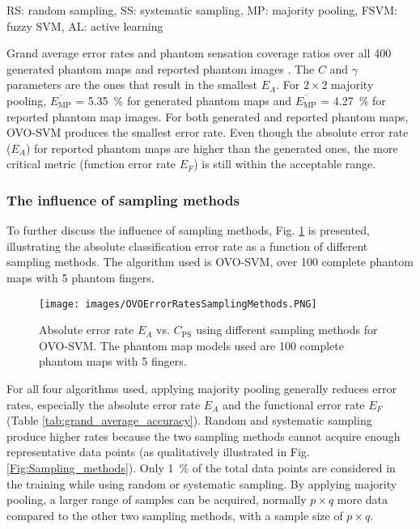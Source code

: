 \begin{table}[!h]
\begin{adjustbox}{angle=90}
\begin{threeparttable}
\begin{tablenotes}
      \small
      \item RS: random sampling, SS: systematic sampling, MP: majority pooling, FSVM: fuzzy SVM, AL: active learning
    \end{tablenotes}
  \end{threeparttable}          
\end{adjustbox} 
\caption{Grand average error rates and phantom sensation coverage ratios over all 400 generated phantom maps and reported phantom images \cite{antfolk2012sensory, bjorkman2016sensory, chai2015characterization}. The $C$ and $\gamma$ parameters are the ones that result in the smallest $E_A$. For $2 \times 2$ majority pooling,  $\overline{E_{\text{MP}}}$ = \SI{5.35}{\%} for generated phantom maps and $\overline{E_{\text{MP}}}$ = \SI{4.27}{\%} for reported phantom map images. For both generated and reported phantom maps, OVO-SVM produces the smallest error rate. Even though the absolute error rate ($E_A$) for reported phantom maps are higher than the generated ones, the more critical metric (function error rate $E_F$) is still within the acceptable range.}
\label{tab:grand_average_accuracy}
\end{table}



\subsubsection{The influence of sampling methods}
To further discuss the influence of sampling methods, Fig. \ref{fig:accuracy_sampling} is presented, illustrating the absolute classification error rate as a function of different sampling methods. The algorithm used is OVO-SVM, over 100 complete phantom maps with 5 phantom fingers. 


\begin{figure}[htb]
    \centering
    \texttt{[image: images/OVOErrorRatesSamplingMethods.PNG]}
    \caption{Absolute error rate $E_A$ vs. $C_{\text{PS}}$ using different sampling methods for OVO-SVM. The phantom map models used are 100 complete phantom maps with 5 fingers.}
    \label{fig:accuracy_sampling}
\end{figure} 

For all four algorithms used, applying majority pooling generally reduces error rates, especially the absolute error rate $E_A$ and the functional error rate $E_F$ (Table \ref{tab:grand_average_accuracy}). Random and systematic sampling produce higher rates because the two sampling methods cannot acquire enough representative data points (as qualitatively illustrated in Fig. \ref{Fig:Sampling_methods}). Only \SI{1}{\%} of the total data points are considered in the training while using random or systematic sampling.
By applying majority pooling, a larger range of samples can be acquired, normally $p \times q$ more data compared to the other two sampling methods, with a sample size of $p \times q$.


